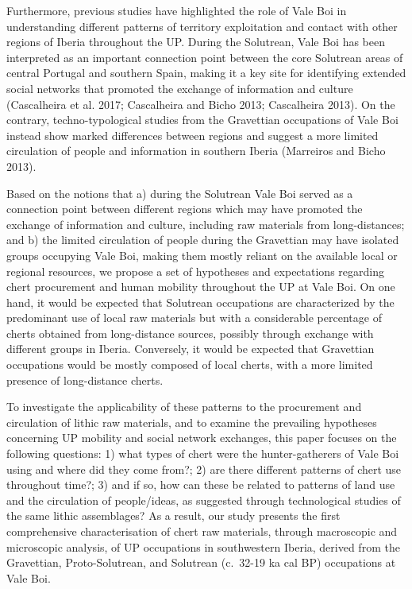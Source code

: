 \documentclass[
  a4paper,
  DIV=11,
  numbers=noendperiod]{scrreprt}
\begin{document}
Furthermore, previous studies have highlighted the role of Vale Boi in
understanding different patterns of territory exploitation and contact
with other regions of Iberia throughout the UP. During the Solutrean,
Vale Boi has been interpreted as an important connection point between
the core Solutrean areas of central Portugal and southern Spain, making
it a key site for identifying extended social networks that promoted the
exchange of information and culture (Cascalheira et al. 2017;
Cascalheira and Bicho 2013; Cascalheira 2013). On the contrary,
techno-typological studies from the Gravettian occupations of Vale Boi
instead show marked differences between regions and suggest a more
limited circulation of people and information in southern Iberia
(Marreiros and Bicho 2013).

Based on the notions that a) during the Solutrean Vale Boi served as a
connection point between different regions which may have promoted the
exchange of information and culture, including raw materials from
long-distances; and b) the limited circulation of people during the
Gravettian may have isolated groups occupying Vale Boi, making them
mostly reliant on the available local or regional resources, we propose
a set of hypotheses and expectations regarding chert procurement and
human mobility throughout the UP at Vale Boi. On one hand, it would be
expected that Solutrean occupations are characterized by the predominant
use of local raw materials but with a considerable percentage of cherts
obtained from long-distance sources, possibly through exchange with
different groups in Iberia. Conversely, it would be expected that
Gravettian occupations would be mostly composed of local cherts, with a
more limited presence of long-distance cherts.

To investigate the applicability of these patterns to the procurement
and circulation of lithic raw materials, and to examine the prevailing
hypotheses concerning UP mobility and social network exchanges, this
paper focuses on the following questions: 1) what types of chert were
the hunter-gatherers of Vale Boi using and where did they come from?; 2)
are there different patterns of chert use throughout time?; 3) and if
so, how can these be related to patterns of land use and the circulation
of people/ideas, as suggested through technological studies of the same
lithic assemblages? As a result, our study presents the first
comprehensive characterisation of chert raw materials, through
macroscopic and microscopic analysis, of UP occupations in southwestern
Iberia, derived from the Gravettian, Proto-Solutrean, and Solutrean
(c.~32-19 ka cal BP) occupations at Vale Boi.
\end{document}
